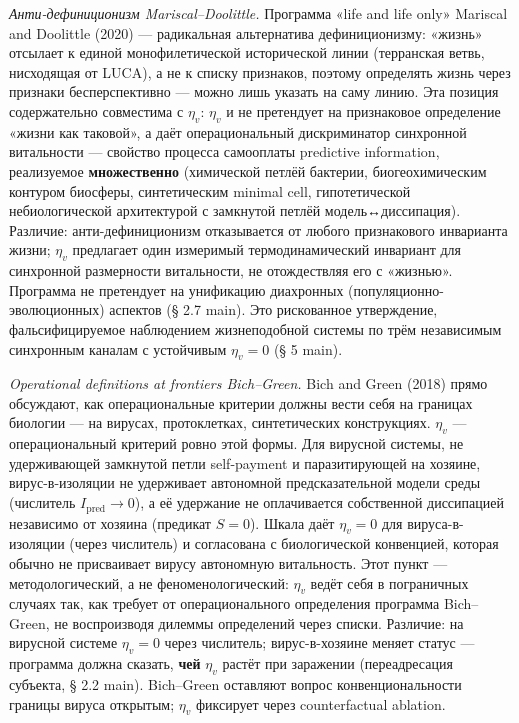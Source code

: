 \documentclass[pdflatex,sn-mathphys-ay]{sn-jnl}
\begin{document}
\emph{Анти-дефиниционизм Mariscal--Doolittle.} Программа «life and life only» Mariscal and Doolittle (2020) --- радикальная альтернатива дефиниционизму: «жизнь» отсылает к единой монофилетической исторической линии (терранская ветвь, нисходящая от LUCA), а не к списку признаков, поэтому определять жизнь через признаки бесперспективно --- можно лишь указать на саму линию. Эта позиция содержательно совместима с \(\eta_v\): \(\eta_v\) и не претендует на признаковое определение «жизни как таковой», а даёт операциональный дискриминатор синхронной витальности --- свойство процесса самооплаты predictive information, реализуемое \textbf{множественно} (химической петлёй бактерии, биогеохимическим контуром биосферы, синтетическим minimal cell, гипотетической небиологической архитектурой с замкнутой петлёй модель↔диссипация). Различие: анти-дефиниционизм отказывается от любого признакового инварианта жизни; \(\eta_v\) предлагает один измеримый термодинамический инвариант для синхронной размерности витальности, не отождествляя его с «жизнью». Программа не претендует на унификацию диахронных (популяционно-эволюционных) аспектов (§ 2.7 main). Это рискованное утверждение, фальсифицируемое наблюдением жизнеподобной системы по трём независимым синхронным каналам с устойчивым \(\eta_v = 0\) (§ 5 main).

\emph{Operational definitions at frontiers Bich--Green.} Bich and Green (2018) прямо обсуждают, как операциональные критерии должны вести себя на границах биологии --- на вирусах, протоклетках, синтетических конструкциях. \(\eta_v\) --- операциональный критерий ровно этой формы. Для вирусной системы, не удерживающей замкнутой петли self-payment и паразитирующей на хозяине, вирус-в-изоляции не удерживает автономной предсказательной модели среды (числитель \(I_{\text{pred}} \to 0\)), а её удержание не оплачивается собственной диссипацией независимо от хозяина (предикат \(S = 0\)). Шкала даёт \(\eta_v = 0\) для вируса-в-изоляции (через числитель) и согласована с биологической конвенцией, которая обычно не присваивает вирусу автономную витальность. Этот пункт --- методологический, а не феноменологический: \(\eta_v\) ведёт себя в пограничных случаях так, как требует от операционального определения программа Bich--Green, не воспроизводя дилеммы определений через списки. Различие: на вирусной системе \(\eta_v = 0\) через числитель; вирус-в-хозяине меняет статус --- программа должна сказать, \textbf{чей} \(\eta_v\) растёт при заражении (переадресация субъекта, § 2.2 main). Bich--Green оставляют вопрос конвенциональности границы вируса открытым; \(\eta_v\) фиксирует через counterfactual ablation.
\end{document}
